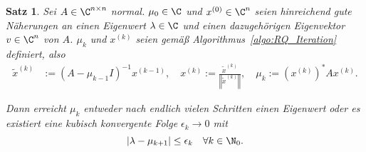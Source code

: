 \documentclass[
]{mycourse}
\theoremstyle{mythm}
\newtheorem{theorem}{Satz}[chapter]
\theoremstyle{break}
\newcommand{\norm}[1]{\left\Vert#1\right\Vert}		%
\begin{document}
\begin{theorem}\label{thm:RQ}
Sei $A\in \C^{n\times n}$ normal. $\mu_0\in \C$ und $x^{(0)}\in \C^n$ seien hinreichend gute Näherungen an einen Eigenwert $\lambda\in \C$ und
einen dazugehörigen Eigenvektor $v\in \C^n$ von $A$. $\mu_k$ und $x^{(k)}$ seien gemäß Algorithmus~\ref{algo:RQ_Iteration}
definiert, also
\begin{align*}
\tilde x^{(k)}&:=(A-\mu_{k-1} I)^{-1} x^{(k-1)}, \quad x^{(k)}:=\frac{\tilde x^{(k)}}{\norm{\tilde x^{(k)}}}, \quad 
\mu_k:=(x^{(k)})^* A x^{(k)}.
\end{align*}

Dann erreicht $\mu_k$ entweder nach endlich vielen Schritten einen Eigenwert oder es existiert eine
kubisch konvergente Folge $\epsilon_k\to 0$ mit
\[
|\lambda - \mu_{k+1} | \leq \epsilon_k \quad \forall k\in \N_0.
\]
\end{theorem}
\end{document}
